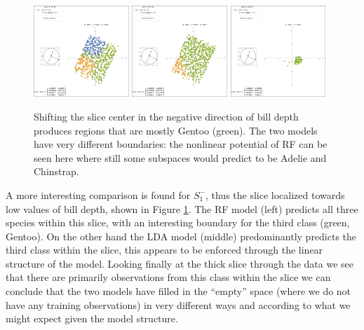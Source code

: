 \documentclass[]{interact}
\theoremstyle{plain}%
\theoremstyle{definition}
\theoremstyle{remark}
\begin{document}
\begin{figure}[ht]
\centerline{\includegraphics[width=0.32\textwidth]{figures/slice1_m_rf.png}
\includegraphics[width=0.32\textwidth]{figures/slice1_m_lda.png}
\includegraphics[width=0.32\textwidth]{figures/slice1_m_data.png}}
\caption{Shifting the slice center in the negative direction of bill depth produces regions that are mostly Gentoo (green). The two models have very different boundaries: the nonlinear potential of RF can be seen here where still some subspaces would predict to be Adelie and Chinstrap.}
\label{slice1m}
\end{figure}

A more interesting comparison is found for \(S_1^{-}\), thus the slice
localized towards low values of bill depth, shown in Figure
\ref{slice1m}. The RF model (left) predicts all three species within
this slice, with an interesting boundary for the third class (green,
Gentoo). On the other hand the LDA model (middle) predominantly predicts
the third class within the slice, this appears to be enforced through
the linear structure of the model. Looking finally at the thick slice
through the data we see that there are primarily observations from this
class within the slice we can conclude that the two models have filled
in the ``empty'' space (where we do not have any training observations)
in very different ways and according to what we might expect given the
model structure.
\end{document}
